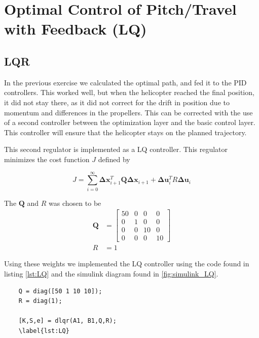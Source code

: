 
\section{Optimal Control of Pitch/Travel with Feedback (LQ)}
\subsection{LQR}
In the previous exercise we calculated the optimal path, and fed it to the PID controllers. This worked well, but when the helicopter reached the final position, it did not stay there, as it did not correct for the drift in position due to momentum and differences in the propellers. This can be corrected with the use of a second controller between the optimization layer and the basic control layer. This controller will ensure that the helicopter stays on the planned trajectory.

This second regulator is implemented as a LQ controller. This regulator minimizes the cost function $J$ defined by

\begin{equation}
    J = \sum^{\infty}_{i=0} \mathbf{\Delta} \mathbf{x}^T_{i+1}\mathbf{Q}\mathbf{\Delta} \mathbf{x}_{i+1}+\mathbf{\Delta} \mathbf{u}_i^T R \mathbf{\Delta} \mathbf{u}_i
\end{equation}

The $\mathbf{Q}$ and $R$ was chosen to be
\begin{subequations}
    \begin{align}
        \mathbf{Q} &= \begin{bmatrix}
            50 & 0 & 0 & 0\\
            0 & 1 & 0 & 0 \\
            0 & 0 & 10 & 0\\
            0 & 0 & 0 & 10
        \end{bmatrix}\\
        R &= 1
    \end{align}
\end{subequations}

Using these weights we implemented the LQ controller using the code found in listing \cref{lst:LQ} and the simulink diagram found in \cref{fig:simulink_LQ}.

\begin{lstlisting}
    Q = diag([50 1 10 10]);
    R = diag(1);

    [K,S,e] = dlqr(A1, B1,Q,R);
    \label{lst:LQ}
\end{lstlisting}

